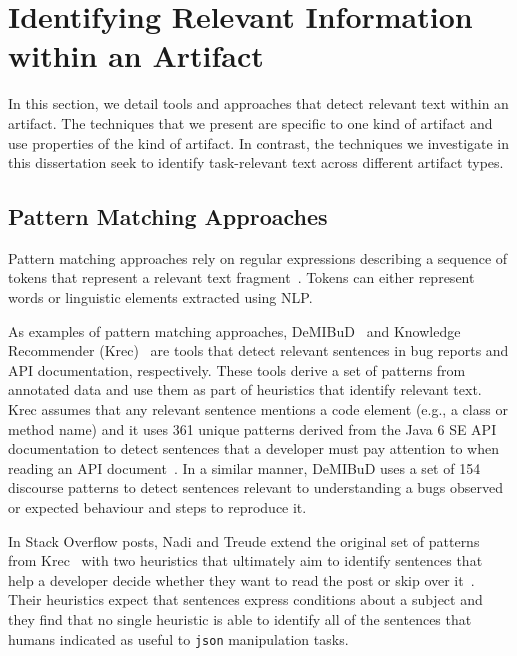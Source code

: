 \section{Identifying Relevant Information within an Artifact}
\label{cp2:artifact-approaches}


In this section, we detail tools and approaches that
detect relevant text within an artifact.
The techniques that we present
are specific to one kind of
artifact and use properties of the kind of
artifact. In contrast, the techniques we
investigate in this dissertation seek to identify 
task-relevant text across different artifact types.




\subsection{Pattern Matching Approaches}


Pattern matching approaches rely on regular expressions describing a sequence of tokens that represent a relevant text fragment~\cite{Bavota2016}. Tokens can either represent words or linguistic elements 
extracted using \acf{NLP}.
    
    
As examples  of pattern matching approaches,  {\small DeMIBuD}~\cite{Chaparro2017} and Knowledge Recommender (Krec)~\cite{Maalej2013, Robillard2015} are tools that detect relevant sentences in bug reports and API documentation, respectively. 
These tools derive a set of patterns from annotated data and use them as part of heuristics 
that identify relevant text. Krec assumes that any relevant sentence mentions a 
code element (e.g., a class or method name) and it uses  361 unique patterns derived from the Java 6 SE API documentation to 
detect sentences that a developer must pay attention to when reading an API document~\cite{Robillard2015}.
In a similar manner, {\small DeMIBuD} uses a set of 154 discourse patterns to detect sentences 
relevant to understanding a bugs observed or expected behaviour and steps to reproduce it.





In  Stack Overflow posts, Nadi and Treude  extend the original set of patterns from Krec~\cite{Robillard2015} with two heuristics that ultimately aim to identify sentences that help a developer decide whether they want to read the post or skip over it~\cite{nadi2020}. 
Their heuristics expect that sentences express conditions about a subject and 
they find that no single heuristic is able to identify all of the sentences 
that humans indicated as useful to \texttt{json} manipulation tasks. 








